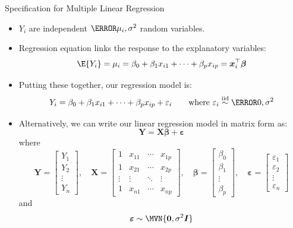 \documentclass[oneside]{book}\usepackage[]{graphicx}\usepackage[svgnames]{xcolor}
\newcommand{\iid}{\overset{\text{iid}}{\sim}}%
\providecommand{\RandomVector}[1]{\bm{#1}}%
\providecommand{\Vector}[1]{\bm{#1}}%
\providecommand{\Matrix}[1]{\bm{#1}}
\begin{document}
\begin{Regular}{Specification for Multiple Linear Regression}
      \begin{itemize}[leftmargin=*]
            \item $ Y_i $ are independent $ \N{\mu_i,\sigma^2} $ random variables.
            \item Regression equation links the response to the explanatory variables:
                  \[ \E{Y_i}=\mu_i=\beta_0+\beta_1x_{i1}+\cdots+\beta_p x_{ip}=\Vector{x}_i^\top \Vector{\beta} \]
            \item Putting these together, our regression model is:
                  \[ Y_i=\beta_0+\beta_1x_{i1}+\cdots+\beta_p x_{ip}+\varepsilon_i\qquad\text{where $\varepsilon_i\iid\N{0,\sigma^2}$} \]
            \item Alternatively, we can write our linear regression model in matrix form as:
                  \[ \RandomVector{Y}=\Matrix{X}\Vector{\beta}+\RandomVector{\varepsilon} \]
                  where
                  \[ \RandomVector{Y}=\begin{bmatrix}
                              Y_1    \\
                              Y_2    \\
                              \vdots \\
                              Y_n
                        \end{bmatrix},\quad
                        \Matrix{X}=\begin{bmatrix}
                              1      & x_{11} & \cdots & x_{1p} \\
                              1      & x_{21} & \cdots & x_{2p} \\
                              \vdots & \vdots & \ddots & \vdots \\
                              1      & x_{n1} & \cdots & x_{np}
                        \end{bmatrix},\quad
                        \Vector{\beta}=\begin{bmatrix}
                              \beta_0 \\
                              \beta_1 \\
                              \vdots  \\
                              \beta_p
                        \end{bmatrix},\quad
                        \RandomVector{\varepsilon}=
                        \begin{bmatrix}
                              \varepsilon_1 \\
                              \varepsilon_2 \\
                              \vdots        \\
                              \varepsilon_n
                        \end{bmatrix} \]
                  and
                  \[ \RandomVector{\varepsilon} \sim \MVN{\Vector{0},\sigma^2 \Matrix{I}} \]
      \end{itemize}
\end{Regular}
\end{document}
